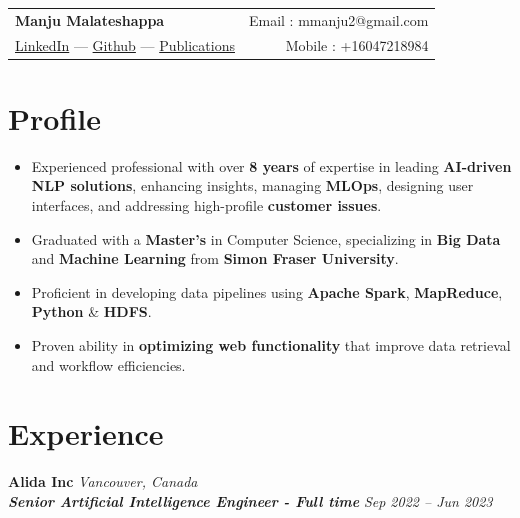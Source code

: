 \documentclass[10pt,a4paper]{article}
\begin{document}
\pagestyle{empty}

\noindent
\begin{tabularx}{\textwidth}{@{}X r@{}}
  {\LARGE\textbf{Manju Malateshappa}} & Email : mmanju2@gmail.com \\
  \href{https://www.linkedin.com/in/manju-malateshappa/}{LinkedIn} ---
  \href{https://github.com/manjum2050}{Github} ---
  \href{https://ieeexplore.ieee.org/abstract/document/6718977?reload=true}{Publications}
  & Mobile : +16047218984 \\
\end{tabularx}

\section{Profile}

\begin{itemize}[leftmargin=*, label=\textbullet]
  \item Experienced professional with over \textbf{8 years} of expertise in leading \textbf{AI-driven NLP solutions}, enhancing insights, managing \textbf{MLOps}, designing user interfaces, and addressing high-profile \textbf{customer issues}.
  \item Graduated with a \textbf{Master's} in Computer Science, specializing in \textbf{Big Data} and \textbf{Machine Learning} from \textbf{Simon Fraser University}.
  \item Proficient in developing data pipelines using \textbf{Apache Spark}, \textbf{MapReduce}, \textbf{Python} \& \textbf{HDFS}.
  \item Proven ability in \textbf{optimizing web functionality} that improve data retrieval and workflow efficiencies.
\end{itemize}

\section{Experience}

\noindent\textbf{Alida Inc} \hfill \textit{Vancouver, Canada} \\
\textit{\textbf{Senior Artificial Intelligence Engineer - Full time}} \hfill \textit{Sep 2022 -- Jun 2023}
\end{document}
